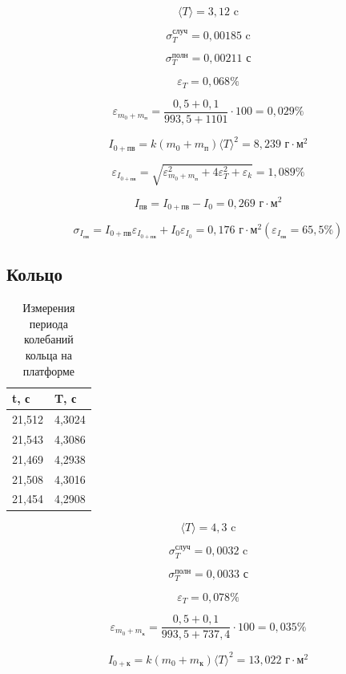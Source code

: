 \documentclass[a4paper, 12pt]{article}
\begin{document}
\[ \langle T \rangle = 3,12 \text{ c}\]

\[\sigma_T^{\text{случ}} = 0,00185 \text{ c}\]

\[\sigma_T^{\text{полн}} = 0,00211 \text{ с}\]

\[\varepsilon_T = 0,068\% \]

\[\varepsilon_{m_0+m_\text{п}} = \frac{0,5+0,1}{993,5+1101} \cdot 100 = 0,029\%\]

\[ I_{0+\text{пв}} = k(m_0+m_\text{п}) {\langle T \rangle}^2 = 8,239 \text{ г}\cdot\text{м}^2\]

\[ \varepsilon_{I_{0+\text{пв}}} = \sqrt{\varepsilon_{m_0+m_\text{п}}^2 + 4\varepsilon_T^2 + \varepsilon_k} = 1,089\%\]

\[ I_\text{пв} = I_{0+\text{пв}} - I_0 = 0,269 \text{ г}\cdot\text{м}^2\]

\[ \sigma_{I_\text{пв}} = I_{0+\text{пв}}\varepsilon_{I_{0+\text{пв}}} + I_0\varepsilon_{I_0} = 0,176 \text{ г}\cdot\text{м}^2 (\varepsilon_{I_\text{пв}} = 65,5\%) \]

\subsection*{Кольцо}

\begin{table}
    \centering
    \begin{tabular}{|l|l|}
    \hline
        t, с & T, с \\ \hline
        21,512 & 4,3024 \\ \hline
        21,543 & 4,3086 \\ \hline
        21,469 & 4,2938 \\ \hline
        21,508 & 4,3016 \\ \hline
        21,454 & 4,2908 \\ \hline
    \end{tabular}
    \caption{Измерения периода колебаний кольца на платформе}
\end{table}

\[ \langle T \rangle = 4,3 \text{ c}\]

\[\sigma_T^{\text{случ}} = 0,0032 \text{ c}\]

\[\sigma_T^{\text{полн}} = 0,0033 \text{ с}\]

\[\varepsilon_T = 0,078\% \]

\[\varepsilon_{m_0+m_\text{к}} = \frac{0,5+0,1}{993,5+737,4} \cdot 100 = 0,035\%\]

\[ I_{0+\text{к}} = k(m_0+m_\text{к}) {\langle T \rangle}^2 = 13,022 \text{ г}\cdot\text{м}^2\]
\end{document}
